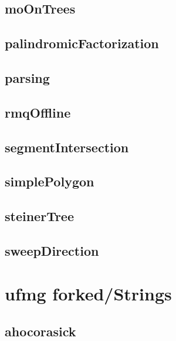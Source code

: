 \subsection{moOnTrees}
\raggedbottom
\hrulefill
\subsection{palindromicFactorization}
\raggedbottom
\hrulefill
\subsection{parsing}
\raggedbottom
\hrulefill
\subsection{rmqOffline}
\raggedbottom
\hrulefill
\subsection{segmentIntersection}
\raggedbottom
\hrulefill
\subsection{simplePolygon}
\raggedbottom
\hrulefill
\subsection{steinerTree}
\raggedbottom
\hrulefill
\subsection{sweepDirection}
\raggedbottom
\hrulefill

\section{ufmg forked/Strings}
\subsection{ahocorasick}
\raggedbottom
\hrulefill
